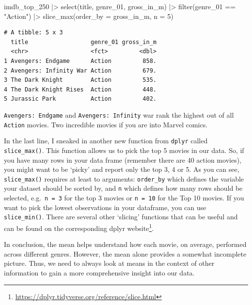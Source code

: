 \documentclass[
  letterpaper,
]{krantz}
\makeatletter
\newenvironment{Shaded}{\begin{snugshade}}{\end{snugshade}}
\newcommand{\AttributeTok}[1]{\textcolor[rgb]{0.40,0.45,0.13}{#1}}
\newcommand{\DecValTok}[1]{\textcolor[rgb]{0.68,0.00,0.00}{#1}}
\newcommand{\FunctionTok}[1]{\textcolor[rgb]{0.28,0.35,0.67}{#1}}
\newcommand{\NormalTok}[1]{\textcolor[rgb]{0.00,0.23,0.31}{#1}}
\newcommand{\SpecialCharTok}[1]{\textcolor[rgb]{0.37,0.37,0.37}{#1}}
\newcommand{\StringTok}[1]{\textcolor[rgb]{0.13,0.47,0.30}{#1}}
\renewcommand{\href}[2]{#2\footnote{\url{#1}}}
\newenvironment{kframe}{%
\medskip{}
\setlength{\fboxsep}{.8em}
 \def\at@end@of@kframe{}%
 \ifinner\ifhmode%
  \def\at@end@of@kframe{\end{minipage}}%
  \begin{minipage}{\columnwidth}%
 \fi\fi%
 \def\FrameCommand##1{\hskip\@totalleftmargin \hskip-\fboxsep
 \colorbox{shadecolor}{##1}\hskip-\fboxsep
     \hskip-\linewidth \hskip-\@totalleftmargin \hskip\columnwidth}%
 \MakeFramed {\advance\hsize-\width
   \@totalleftmargin\z@ \linewidth\hsize
   \@setminipage}}%
 {\par\unskip\endMakeFramed%
 \at@end@of@kframe}
\renewenvironment{Shaded}{\begin{kframe}}{\end{kframe}}
\makeatother
\begin{document}
\begin{Shaded}
\begin{Highlighting}[]
\NormalTok{imdb\_top\_250 }\SpecialCharTok{|\textgreater{}}
  \FunctionTok{select}\NormalTok{(title, genre\_01, gross\_in\_m) }\SpecialCharTok{|\textgreater{}}
  \FunctionTok{filter}\NormalTok{(genre\_01 }\SpecialCharTok{==} \StringTok{"Action"}\NormalTok{) }\SpecialCharTok{|\textgreater{}}
  \FunctionTok{slice\_max}\NormalTok{(}\AttributeTok{order\_by =}\NormalTok{ gross\_in\_m,}
            \AttributeTok{n =} \DecValTok{5}\NormalTok{)}
\end{Highlighting}
\end{Shaded}

\begin{verbatim}
# A tibble: 5 x 3
  title                  genre_01 gross_in_m
  <chr>                  <fct>         <dbl>
1 Avengers: Endgame      Action         858.
2 Avengers: Infinity War Action         679.
3 The Dark Knight        Action         535.
4 The Dark Knight Rises  Action         448.
5 Jurassic Park          Action         402.
\end{verbatim}

\texttt{Avengers:\ Endgame} and \texttt{Avengers:\ Infinity} war rank
the highest out of all \texttt{Action} movies. Two incredible movies if
you are into Marvel comics.

In the last line, I sneaked in another new function from \texttt{dplyr}
called \texttt{slice\_max()}. This function allows us to pick the top 5
movies in our data. So, if you have many rows in your data frame
(remember there are 40 action movies), you might want to be `picky' and
report only the top 3, 4 or 5. As you can see, \texttt{slice\_max()}
requires at least to arguments: \texttt{order\_by} which defines the
variable your dataset should be sorted by, and \texttt{n} which defines
how many rows should be selected, e.g.~\texttt{n\ =\ 3} for the top 3
movies or \texttt{n\ =\ 10} for the Top 10 movies. If you want to pick
the lowest observations in your dataframe, you can use
\texttt{slice\_min()}. There are several other `slicing' functions that
can be useful and can be found on the corresponding
\href{https://dplyr.tidyverse.org/reference/slice.html}{dplyr website}.

In conclusion, the mean helps understand how each movie, on average,
performed across different genres. However, the mean alone provides a
somewhat incomplete picture. Thus, we need to always look at means in
the context of other information to gain a more comprehensive insight
into our data.
\end{document}
